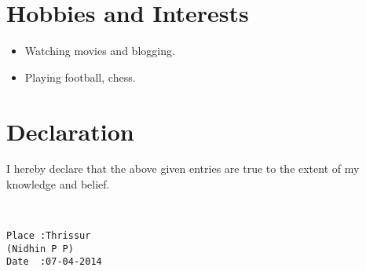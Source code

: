 \documentclass[11pt,a4paper]{moderncv}
\begin{document}
\section{Hobbies and Interests}
	\begin{itemize}
		\item{ Watching movies and blogging.}
		\item{ Playing football, chess.}
		\end{itemize}
			

	
\section{Declaration}

I hereby declare that the above given entries are true to the extent of my knowledge and belief. 
\begin{verbatim}


Place :Thrissur                                                          (Nidhin P P)
Date  :07-04-2014 
\end{verbatim}
	
	
\end{document}
